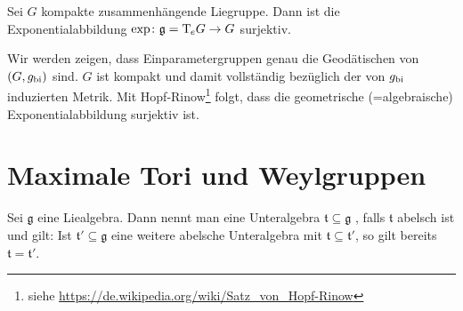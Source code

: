 \begin{lemma}[{name=[Exponentialabbildung surjektiv für kompakte und zusammenhängend]},label=lem:237]
	Sei $G$ kompakte zusammenhängende Liegruppe.
	Dann ist die Exponentialabbildung $\exp\colon \mathfrak{g} = \mathrm{T}\mkern-0.85mu_e G \to G$ surjektiv.
\end{lemma}
\begin{beweis}
	Wir werden zeigen, dass Einparametergruppen genau die Geodätischen von $(G,g_{\mathrm{bi}})$ sind. 
	$G$ ist kompakt und damit vollständig bezüglich der von $g_{\mathrm{bi}}$ induzierten Metrik.
	Mit Hopf-Rinow\footnote{siehe \url{https://de.wikipedia.org/wiki/Satz_von_Hopf-Rinow}} folgt, dass die geometrische (=algebraische) Exponentialabbildung surjektiv ist.
\end{beweis}

\section{Maximale Tori und Weylgruppen} %
\label{sec:24}

\begin{definition}[{name=[maximal abelsche Unteralgebra]}]
	Sei $\mathfrak{g}$ eine Liealgebra.
	Dann nennt man eine Unteralgebra $\mathfrak{t} \subseteq \mathfrak{g}$ , falls $\mathfrak{t}$ abelsch ist und gilt: Ist $\mathfrak{t}' \subseteq \mathfrak{g}$ eine weitere abelsche Unteralgebra mit $\mathfrak{t} \subseteq \mathfrak{t}'$, so gilt bereits $\mathfrak{t} = \mathfrak{t}'$.
\end{definition}

